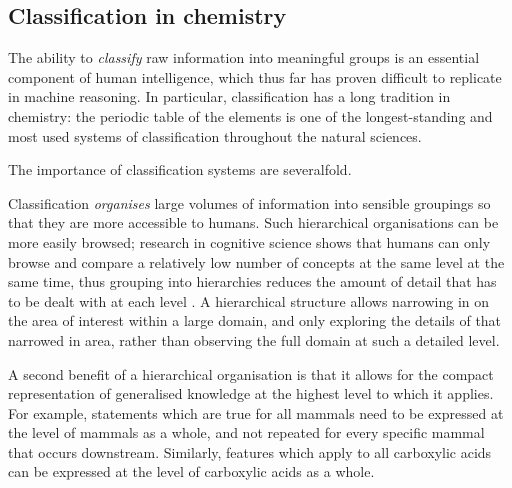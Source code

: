 \documentclass[10pt]{bmc_article}
\newenvironment{bmcformat}{\baselineskip20pt\sloppy\setboolean{publ}{false}}{\baselineskip20pt\sloppy}
\begin{document}
\begin{bmcformat}
\subsection*{Classification in chemistry}
\label{sec:backclassif}

The ability to \textit{classify} raw information into meaningful groups is an essential component of human intelligence, which thus far has proven difficult to replicate in machine reasoning.  In particular, classification has a long tradition in chemistry:  the periodic table of the elements is one of the longest-standing and most used systems of classification throughout the natural sciences.  

The importance of classification systems are severalfold. 

Classification \textit{organises} large volumes of information into sensible groupings so that they are more accessible to humans. Such hierarchical organisations can be more easily browsed; research in cognitive science shows that humans can only browse and compare a relatively low number of concepts at the same level at the same time, thus grouping into hierarchies reduces the amount of detail that has to be dealt with at each level \cite{sternberg2003}. A hierarchical structure allows narrowing in on the area of interest within a large domain, and only exploring the details of that narrowed in area, rather than observing the full domain at such a detailed level.
 
A second benefit of a hierarchical organisation is that it allows for the compact representation of generalised knowledge at the highest level to which it applies.  For example, statements which are true for all mammals need to be expressed at the level of mammals as a whole, and not repeated for every specific mammal that occurs downstream.  Similarly, features which apply to all carboxylic acids can be expressed at the level of carboxylic acids as a whole. 


\end{bmcformat}
\end{document}
